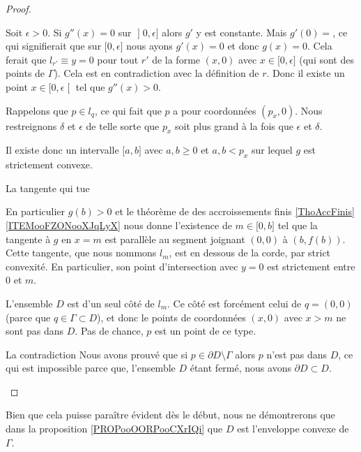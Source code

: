 \begin{proof}
\begin{subproof}
        Soit \( \epsilon>0\). Si \( g''(x)=0\) sur \( \mathopen] 0 , \epsilon \mathclose]\) alors \( g'\) y est constante. Mais \( g'(0)=\), ce qui signifierait que sur \( \mathopen[ 0 , \epsilon \mathclose]\) nous ayons \( g'(x)=0\) et donc \( g(x)=0\). Cela ferait que \( l_{r'}\equiv y=0\) pour tout \( r'\) de la forme \( (x,0)\) avec \( x\in \mathopen[ 0 , \epsilon \mathclose]\) (qui sont des points de \( \Gamma\)). Cela est en contradiction avec la définition de \( r\). Donc il existe un point \(x\in \mathopen[ 0 , \epsilon \mathclose[\) tel que \( g''(x)>0\).

        Rappelons que \( p\in l_q\), ce qui fait que \( p\) a pour coordonnées \( (p_x,0)\). Nous restreignons \( \delta\) et \( \epsilon\) de telle sorte que \( p_x\) soit plus grand à la fois que \( \epsilon\) et \(\delta\).

        Il existe donc un intervalle \( \mathopen[ a , b \mathclose]\) avec \( a,b\geq 0\) et \( a,b<p_x\) sur lequel \( g\) est strictement convexe. 
        
    \item[La tangente qui tue]

        En particulier \( g(b)>0\) et le théorème de des accroissements finis \ref{ThoAccFinis}\ref{ITEMooFZONooXJqLyX} nous donne l'existence de \( m\in\mathopen[ 0 , b \mathclose]\) tel que la tangente à \( g\) en \( x=m\) est parallèle au segment joignant \( (0,0)\) à \( (b,f(b))\). Cette tangente, que nous nommons \( l_m\), est en dessous de la corde, par strict convexité. En particulier, son point d'intersection avec \( y=0\) est strictement entre \( 0\) et \( m\).

        L'ensemble \( D\) est d'un seul côté de \(l_m\). Ce côté est forcément celui de \( q=(0,0)\) (parce que \( q\in \Gamma\subset D\)), et donc le points de coordonnées \( (x,0)\) avec \( x>m\) ne sont pas dans \(D\). Pas de chance, \( p\) est un point de ce type.

    \item[La contradiction]
        Nous avons prouvé que si \( p\in \partial D\setminus \Gamma\) alors \( p\) n'est pas dans \( D\), ce qui est impossible parce que, l'ensemble \( D\) étant fermé, nous avons \( \partial D\subset D\).
    \end{subproof}
\end{proof}

\begin{remark}
   Bien que cela puisse paraître évident dès le début, nous ne démontrerons que dans la proposition \ref{PROPooOORPooCXrIQi} que \( D\) est l'enveloppe convexe de \( \Gamma\).
\end{remark}

